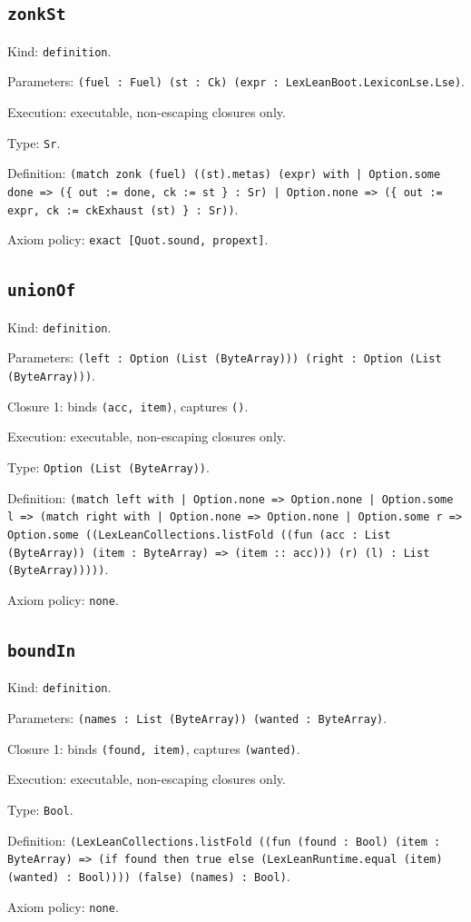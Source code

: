 \documentclass[11pt]{article}
\begin{document}
\subsection*{\texttt{zonkSt}}
\noindent Kind: \texttt{definition}.\par
\noindent Parameters: \texttt{(fuel : Fuel) (st : Ck) (expr : LexLeanBoot.LexiconLse.Lse)}.\par
\noindent Execution: executable, non-escaping closures only.\par
\noindent Type: \texttt{Sr}.\par
\noindent Definition: \texttt{(match zonk (fuel) ((st).metas) (expr) with | Option.some done => (\{ out := done, ck := st \} : Sr) | Option.none => (\{ out := expr, ck := ckExhaust (st) \} : Sr))}.\par
\noindent Axiom policy: \texttt{exact [Quot.sound, propext]}.\par
\subsection*{\texttt{unionOf}}
\noindent Kind: \texttt{definition}.\par
\noindent Parameters: \texttt{(left : Option (List (ByteArray))) (right : Option (List (ByteArray)))}.\par
\noindent Closure 1: binds \texttt{(acc, item)}, captures \texttt{()}.\par
\noindent Execution: executable, non-escaping closures only.\par
\noindent Type: \texttt{Option (List (ByteArray))}.\par
\noindent Definition: \texttt{(match left with | Option.none => Option.none | Option.some l => (match right with | Option.none => Option.none | Option.some r => Option.some ((LexLeanCollections.listFold ((fun (acc : List (ByteArray)) (item : ByteArray) => (item :: acc))) (r) (l) : List (ByteArray)))))}.\par
\noindent Axiom policy: \texttt{none}.\par
\subsection*{\texttt{boundIn}}
\noindent Kind: \texttt{definition}.\par
\noindent Parameters: \texttt{(names : List (ByteArray)) (wanted : ByteArray)}.\par
\noindent Closure 1: binds \texttt{(found, item)}, captures \texttt{(wanted)}.\par
\noindent Execution: executable, non-escaping closures only.\par
\noindent Type: \texttt{Bool}.\par
\noindent Definition: \texttt{(LexLeanCollections.listFold ((fun (found : Bool) (item : ByteArray) => (if found then true else (LexLeanRuntime.equal (item) (wanted) : Bool)))) (false) (names) : Bool)}.\par
\noindent Axiom policy: \texttt{none}.\par
\end{document}
